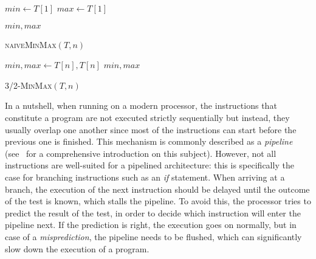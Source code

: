 \documentclass[proceedings]{aofa}
\begin{document}
\noindent
\begin{minipage}{.41\textwidth}
\begin{small}
\begin{algorithm}[H]
\DontPrintSemicolon
  $min \gets T[1]$\;
  $max \gets T[1]$\;
  \smallskip
                                     

  \Return $min,max$
\caption{ \textsc{naiveMinMax}$(T,n)$ \label{algo:naiveMinMax}}
\end{algorithm}
\end{small}

\medskip
\end{minipage}  
\hfill
\begin{minipage}{.54\textwidth}
\vspace{0pt}  
\begin{algorithm}[H]
\begin{small}
\DontPrintSemicolon
  $min,max \gets T[n],T[n]$\;
  \Return $min,max$
\caption{ \textsc{3/2-MinMax}$(T,n)$ \label{algo:32MinMax}}
\end{small}
\end{algorithm}
\medskip
\end{minipage}

In a nutshell, when running on a modern processor, the instructions that constitute a program are not executed strictly sequentially but instead, they usually overlap one another since most of the instructions can start before the previous one is finished. This mechanism is commonly described as a {\em pipeline} (see~\cite{HePa11} for a comprehensive introduction on this subject). However, not all instructions are well-suited for a pipelined architecture: this is specifically the case for branching instructions such as an \emph{if} statement. When arriving at a branch, the execution of the next instruction should be delayed until the outcome of the test is known, which stalls the pipeline. To avoid this, the processor tries to predict the result of the test, in order to decide which instruction will enter the pipeline next.
If the prediction is right, the execution goes on normally, but in case of a {\em misprediction}, the pipeline needs to be flushed, which can significantly slow down the execution of a program.
\end{document}

